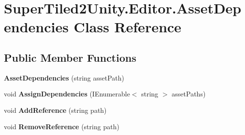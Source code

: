 \hypertarget{class_super_tiled2_unity_1_1_editor_1_1_asset_dependencies}{}\section{Super\+Tiled2\+Unity.\+Editor.\+Asset\+Dependencies Class Reference}
\label{class_super_tiled2_unity_1_1_editor_1_1_asset_dependencies}
\subsection*{Public Member Functions}
\begin{DoxyCompactItemize}
\item 
\mbox{\label{class_super_tiled2_unity_1_1_editor_1_1_asset_dependencies_a740b48231637f33759a2a5ae039fb5e0}} 
{\bfseries Asset\+Dependencies} (string asset\+Path)
\item 
\mbox{\label{class_super_tiled2_unity_1_1_editor_1_1_asset_dependencies_a0619818628976ea7899712504b34f9a8}} 
void {\bfseries Assign\+Dependencies} (I\+Enumerable$<$ string $>$ asset\+Paths)
\item 
\mbox{\label{class_super_tiled2_unity_1_1_editor_1_1_asset_dependencies_a6889f978e60b1123ec666922e74885ac}} 
void {\bfseries Add\+Reference} (string path)
\item 
\mbox{\label{class_super_tiled2_unity_1_1_editor_1_1_asset_dependencies_a506d591697b5e664c97a0c8cfdaaef42}} 
void {\bfseries Remove\+Reference} (string path)
\end{DoxyCompactItemize}

